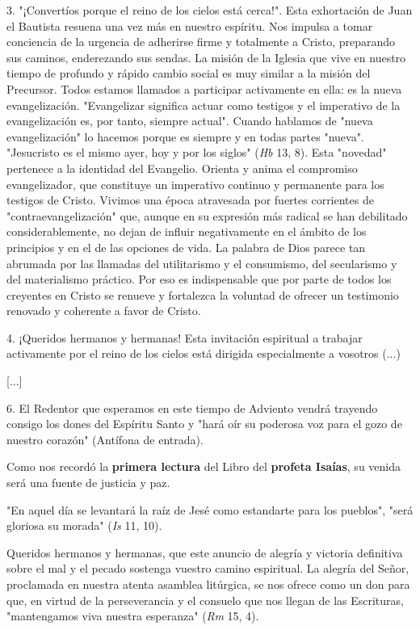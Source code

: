 3. "¡Convertíos porque el reino de los cielos está cerca!". Esta
exhortación de Juan el Bautista resuena una vez más en nuestro espíritu.
Nos impulsa a tomar conciencia de la urgencia de adherirse firme y
totalmente a Cristo, preparando sus caminos, enderezando sus sendas. La
misión de la Iglesia que vive en nuestro tiempo de profundo y rápido
cambio social es muy similar a la misión del Precursor. Todos estamos
llamados a participar activamente en ella: es la nueva evangelización.
"Evangelizar significa actuar como testigos y el imperativo de la
evangelización es, por tanto, siempre actual". Cuando hablamos de "nueva
evangelización" lo hacemos porque es siempre y en todas partes "nueva".
"Jesucristo es el mismo ayer, hoy y por los siglos" (\emph{Hb} 13, 8).
Esta "novedad" pertenece a la identidad del Evangelio. Orienta y anima
el compromiso evangelizador, que constituye un imperativo continuo y
permanente para los testigos de Cristo. Vivimos una época atravesada por
fuertes corrientes de "contraevangelización" que, aunque en su expresión
más radical se han debilitado considerablemente, no dejan de influir
negativamente en el ámbito de los principios y en el de las opciones de
vida. La palabra de Dios parece tan abrumada por las llamadas del
utilitarismo y el consumismo, del secularismo y del materialismo
práctico. Por eso es indispensable que por parte de todos los creyentes
en Cristo se renueve y fortalezca la voluntad de ofrecer un testimonio
renovado y coherente a favor de Cristo.

4. ¡Queridos hermanos y hermanas! Esta invitación espiritual a trabajar
activamente por el reino de los cielos está dirigida especialmente a
vosotros (...)

{[}...{]}

6. El Redentor que esperamos en este tiempo de Adviento vendrá trayendo
consigo los dones del Espíritu Santo y "hará oír su poderosa voz para el
gozo de nuestro corazón" (Antífona de entrada).

Como nos recordó la \textbf{primera lectura} del Libro del
\textbf{profeta Isaías}, su venida será una fuente de justicia y paz.

"En aquel día se levantará la raíz de Jesé como estandarte para los
pueblos", "será gloriosa su morada" (\emph{Is} 11, 10).

Queridos hermanos y hermanas, que este anuncio de alegría y victoria
definitiva sobre el mal y el pecado sostenga vuestro camino espiritual.
La alegría del Señor, proclamada en nuestra atenta asamblea litúrgica,
se nos ofrece como un don para que, en virtud de la perseverancia y el
consuelo que nos llegan de las Escrituras, "mantengamos viva nuestra
esperanza" (\emph{Rm} 15, 4).

